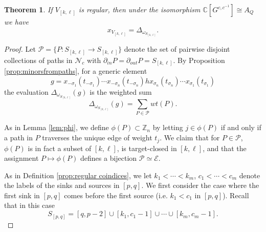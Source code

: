 \documentclass[12pt]{amsart}
\newcommand{\CC}{\mathbb{C}}
\newcommand{\ZZ}{\mathbb{Z}}
\newcommand{\cE}{\mathcal{E}}
\newcommand{\cN}{\mathcal{N}} %
\newcommand{\cP}{\mathcal{P}}
\newtheorem{theorem}{Theorem}[section]
\theoremstyle{remark}
\numberwithin{equation}{section}
\begin{document}
\begin{theorem}
  If $V_{[k,\ell]}$ is regular, then under the isomorphism $\CC[G^{c,c^{-1}}] \cong A_Q$ we have
  \[x_{V_{[k,\ell]}} = \Delta_{\omega_{S_{[k,\ell]}}}.\]  
\end{theorem}
\begin{proof}
Let $\cP = \{P: S_{[k,\ell]} \to S_{[k,\ell]}\}$ denote the set of pairwise disjoint collections of paths in $\cN_c$ with $\partial_{in}P = \partial_{out}P = S_{[k,\ell]}$. 
By Proposition \ref{prop:minorsfrompaths}, for a generic element 
\[g = x_{-\sigma_1}(t_{-\sigma_1})\cdots x_{-\sigma_n}(t_{-\sigma_n}) hx_{\sigma_n}(t_{\sigma_n}) \cdots x_{\sigma_1}(t_{\sigma_1})\]
the evaluation $\Delta_{\omega_{S_{[k,\ell]}}}(g)$ is the weighted sum 
\[
\Delta_{\omega_{S_{[k,\ell]}}}(g) = \sum_{P \in \mathcal{P}} wt(P).
\]

As in Lemma \ref{lem:phi}, we define $\phi(P) \subset \ZZ_n$ by letting $j \in \phi(P)$ if and only if a path in $P$ traverses the unique edge of weight $t_j$. We claim that for $P \in \cP$, $\phi(P)$ is in fact a subset of $[k,\ell]$, is target-closed in $[k,\ell]$, and that the assignment $P \mapsto \phi(P)$ defines a bijection $\cP \simeq \cE$.




As in Definition \ref{prop:regular coindices}, we let $k_1 < \cdots < k_m$, $c_1 < \cdots < c_m$ denote the labels of the sinks and sources in $[p,q]$. We first consider the case where the first sink in $[p,q]$ comes before the first source (i.e. $k_1 < c_1$ in $[p,q]$). Recall that in this case
\[
S_{[p,q]} = [q,p-2] \cup [k_1, c_1 -1] \cup \cdots \cup [k_m, c_m - 1].
\]


\end{proof}
\end{document}

